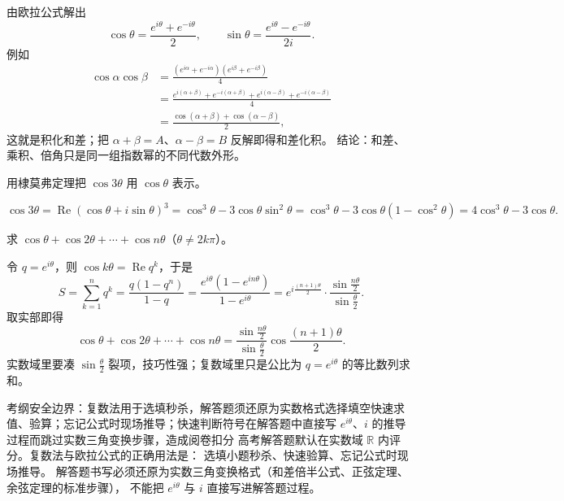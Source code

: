 \begin{explore}
由欧拉公式解出
\[
  \cos\theta=\frac{e^{i\theta}+e^{-i\theta}}{2},\qquad
  \sin\theta=\frac{e^{i\theta}-e^{-i\theta}}{2i}.
\]
例如
\begin{align*}
  \cos\alpha\cos\beta
  &=\frac{(e^{i\alpha}+e^{-i\alpha})(e^{i\beta}+e^{-i\beta})}{4}\\
  &=\frac{e^{i(\alpha+\beta)}+e^{-i(\alpha+\beta)}+e^{i(\alpha-\beta)}+e^{-i(\alpha-\beta)}}{4}\\
  &=\frac{\cos(\alpha+\beta)+\cos(\alpha-\beta)}{2},
\end{align*}
这就是积化和差；把 $\alpha+\beta=A$、$\alpha-\beta=B$ 反解即得和差化积。
结论：和差、乘积、倍角只是同一组指数幂的不同代数外形。

\begin{example}
用棣莫弗定理把 $\cos3\theta$ 用 $\cos\theta$ 表示。
\end{example}
\begin{solution}
\[
  \cos3\theta=\operatorname{Re}(\cos\theta+i\sin\theta)^3
  =\cos^3\theta-3\cos\theta\sin^2\theta
  =\cos^3\theta-3\cos\theta(1-\cos^2\theta)
  =4\cos^3\theta-3\cos\theta.
\]
\end{solution}

\begin{example}
求 $\cos\theta+\cos2\theta+\cdots+\cos n\theta$（$\theta\neq2k\pi$）。
\end{example}
\begin{solution}
令 $q=e^{i\theta}$，则 $\cos k\theta=\operatorname{Re}q^k$，于是
\[
  S=\sum_{k=1}^{n}q^k=\frac{q(1-q^n)}{1-q}
  =\frac{e^{i\theta}(1-e^{in\theta})}{1-e^{i\theta}}
  =e^{i\frac{(n+1)\theta}{2}}\cdot\frac{\sin\frac{n\theta}{2}}{\sin\frac{\theta}{2}}.
\]
取实部即得
\[
  \cos\theta+\cos2\theta+\cdots+\cos n\theta
  =\frac{\sin\frac{n\theta}{2}}{\sin\frac{\theta}{2}}\cos\frac{(n+1)\theta}{2}.
\]
实数域里要凑 $\sin\frac{\theta}{2}$ 裂项，技巧性强；复数域里只是公比为 $q=e^{i\theta}$ 的等比数列求和。
\end{solution}

\begin{conccard}[一级]{考纲安全边界：复数法用于选填秒杀，解答题须还原为实数格式}{选择填空快速求值、验算；忘记公式时现场推导；快速判断符号}{在解答题中直接写 $e^{i\theta}$、$i$ 的推导过程而跳过实数三角变换步骤，造成阅卷扣分}
高考解答题默认在实数域 $\mathbb{R}$ 内评分。复数法与欧拉公式的正确用法是：
选填小题秒杀、快速验算、忘记公式时现场推导。
解答题书写必须还原为实数三角变换格式（和差倍半公式、正弦定理、余弦定理的标准步骤），
不能把 $e^{i\theta}$ 与 $i$ 直接写进解答题过程。
\end{conccard}


\end{explore}
